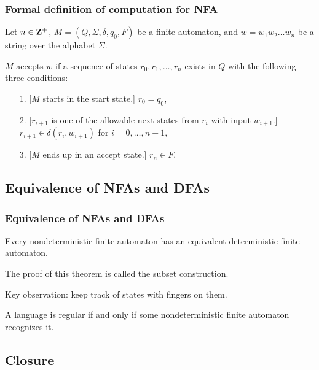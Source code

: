 \documentclass[xcolor=table]{beamer}
\begin{document}
\begin{frame}
  \frametitle{Formal definition of computation for NFA}
  
  Let $n\in \mathbf{Z}^+$, $M = (Q, \Sigma, \delta, q_0, F)$ be a finite
  automaton, and $w = w_1 w_2 \ldots w_n$ be a string over the
  alphabet $\Sigma$.

  \begin{Definition}
  \alert{$M$ accepts $w$} if a sequence of states $r_0, r_1, \ldots,
  r_n$ exists in $Q$ with the following three conditions:

  \begin{enumerate}
    \item[1.] [$M$ starts in the start state.] $r_0 = q_0$,
    \item[2.] [$r_{i+1}$ is one of the allowable next states from
    $r_i$ with input $w_{i+1}$.] \ \ \ \alert{$r_{i+1} \in \delta(r_i, w_{i+1})$}
    for $i = 0,\ldots, n-1$,
    \item[3.] [$M$ ends up in an accept state.] $r_n \in F$.
  \end{enumerate}
  \end{Definition}

\end{frame}


\subsection[NFA $\approx$ DFA]{Equivalence of NFAs and DFAs}

\begin{frame}
  \frametitle{Equivalence of NFAs and DFAs}

  \begin{Theorem}
    Every nondeterministic
      finite automaton has an equivalent deterministic finite automaton.
  \end{Theorem}

  \bigskip
  The proof of this theorem is called the \alert{subset construction}.

  Key observation: keep track of states with fingers on them.

  \begin{Corollary}
    A language is regular if
    and only if some nondeterministic finite automaton recognizes
    it.
  \end{Corollary}
\end{frame}

\subsection[closure]{Closure}
\end{document}
